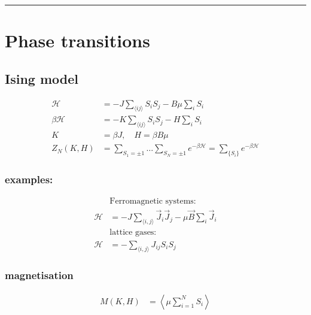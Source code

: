 \noindent\rule[1ex]{\textwidth/5}{1pt}
\section{Phase transitions}

\subsection*{Ising model}
\begin{equation*}
    \begin{aligned}
        \mathcal{H} &= -J \sum_{\langle ij \rangle} S_i S_j - B \mu \sum_i S_i \\
        \beta \mathcal{H} &= - K \sum_{\langle i j \rangle} S_i S_j - H \sum_i S_i \\
        K &= \beta J, \quad H = \beta B \mu\\
        Z_N(K,H) &= \sum_{S_1 = \pm 1} \dots \sum_{S_N = \pm 1} e^{-\beta \mathcal{H}} = \sum_{\lbrace S_i \rbrace} e^{-\beta \mathcal{H}}
    \end{aligned}
\end{equation*}

\subsubsection*{examples:}
\begin{equation*}
    \begin{aligned}
        &\text{Ferromagnetic systems:}\\
        \mathcal{H} &= -J \sum_{\langle i,j \rangle} \vec{J}_i \vec{J}_j - \mu \vec{B}\sum_i \vec{J}_i \\
        &\text{lattice gases:} \\
        \mathcal{H} &= -\sum_{\langle i,j \rangle} J_{ij} S_i S_j
    \end{aligned}
\end{equation*}

\subsubsection*{magnetisation}
\begin{equation*}
    \begin{aligned}
        M(K,H) &= \left\langle \mu \sum_{i=1}^{N} S_i \right\rangle
    \end{aligned}
\end{equation*}

